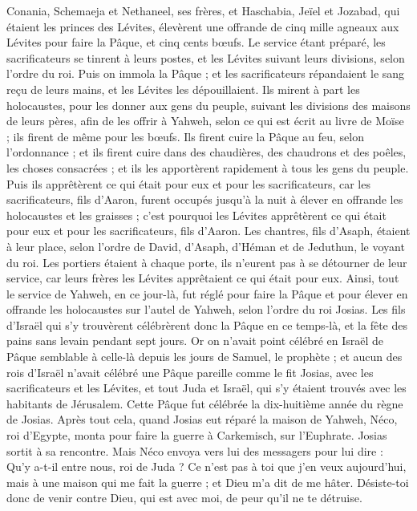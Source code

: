 \begin{multicols}{2}
Conania, Schemaeja et Nethaneel, ses frères, et Haschabia, Jeïel et Jozabad, qui étaient les princes des Lévites, élevèrent une offrande de cinq mille  agneaux aux Lévites pour faire la Pâque, et cinq cents bœufs.
Le service étant préparé, les sacrificateurs se tinrent à leurs postes, et les Lévites suivant leurs divisions, selon l’ordre du roi.
Puis on immola la Pâque ; et les sacrificateurs répandaient le sang reçu de leurs mains, et les Lévites les dépouillaient.
Ils mirent à part les holocaustes, pour les donner aux gens du peuple, suivant les divisions des maisons de leurs pères, afin de les offrir à Yahweh, selon ce qui est écrit au livre de Moïse ; ils firent de même pour les bœufs.
Ils firent cuire la Pâque au feu, selon l'ordonnance ; et ils firent cuire dans des chaudières, des chaudrons et des poêles, les choses consacrées ; et ils les apportèrent rapidement à tous les gens du peuple.
Puis ils apprêtèrent ce qui était pour eux et pour les sacrificateurs, car les sacrificateurs, fils d'Aaron, furent occupés jusqu'à la nuit à élever en offrande les holocaustes et les graisses ; c'est pourquoi les Lévites apprêtèrent ce qui était pour eux et pour les sacrificateurs, fils d'Aaron.
Les chantres, fils d'Asaph, étaient à leur place, selon l'ordre de David, d'Asaph, d'Héman et de Jeduthun, le voyant du roi. Les portiers étaient à chaque porte, ils n'eurent pas à se détourner de leur service, car leurs frères les Lévites apprêtaient ce qui était pour eux.
Ainsi, tout le service de Yahweh, en ce jour-là, fut réglé pour faire la Pâque et pour élever en offrande les holocaustes sur l'autel de Yahweh, selon l’ordre du roi Josias.
Les fils d’Israël qui s'y trouvèrent célébrèrent donc la Pâque en ce temps-là, et la fête des pains sans levain pendant sept jours.
Or on n'avait point célébré en Israël de Pâque semblable à celle-là depuis les jours de Samuel, le prophète ; et aucun des rois d'Israël n'avait célébré une Pâque pareille comme le fit Josias, avec les sacrificateurs et les Lévites, et tout Juda et Israël, qui s'y étaient trouvés avec les habitants de Jérusalem.
Cette Pâque fut célébrée la dix-huitième année du règne de Josias.
Après tout cela, quand Josias eut réparé la maison de Yahweh, Néco, roi d'Egypte, monta pour faire la guerre à Carkemisch, sur l'Euphrate. Josias sortit à sa rencontre.
Mais Néco envoya vers lui des messagers pour lui dire : Qu'y a-t-il entre nous, roi de Juda ? Ce n'est pas à toi que j'en veux aujourd'hui, mais à une maison qui me fait la guerre ; et Dieu m'a dit de me hâter. Désiste-toi donc de venir contre Dieu, qui est avec moi, de peur qu'il ne te détruise.

\end{multicols}

